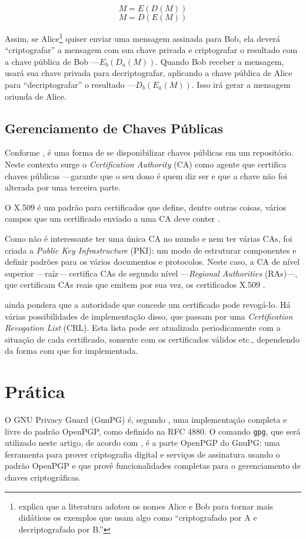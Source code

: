 \documentclass[12px,a4paper,twoside]{article}
\begin{document}
\begin{equation}
M = E(D(M))
\end{equation}
\begin{equation}
M = D(E(M))
\end{equation}

Assim, se Alice\footnote{\cite{oliveira:2} explica que a literatura adotou os
nomes Alice e Bob para tornar mais didáticos os exemplos que usam algo como
``criptografado por A e decriptografado por B.''} quiser enviar uma mensagem
assinada para Bob, ela deverá ``criptografar'' a mensagem com sua chave privada
e criptografar o resultado com a chave pública de Bob ---$E_b(D_a(M))$.  Quando
Bob receber a mensagem, usará sua chave privada para decriptografar, aplicando
a chave pública de Alice para ``decriptografar'' o resultado ---$D_b(E_a(M))$.
Isso irá gerar a mensagem oriunda de Alice.

\subsection{Gerenciamento de Chaves Públicas}
\label{sec:teoria:pki}
Conforme \cite{tanenbaum}, é uma forma de se disponibilizar chaves públicas em
um repositório.  Neste contexto surge o \textit{Certification Authority} (CA)
como agente que certifica chaves públicas ---garante que o seu dono é quem diz
ser e que a chave não foi alterada por uma terceira parte.

O X.509 é um padrão para certificados que define, dentre outras coisas, vários
campos que um certificado enviado a uma CA deve conter \cite{tanenbaum}.

Como não é interessante ter uma única CA no mundo e nem ter várias CAs, foi
criada a \textit{Public Key Infrastructure} (PKI): um modo de estruturar
componentes e definir padrões para os vários documentos e protocolos.  Neste
caso, a CA de nível superior ---raíz--- certifica CAs de segundo nível
---\textit{Regional Authorities} (RAs)---, que certificam CAs reais que emitem
por sua vez, os certificados X.509 \cite{tanenbaum}.

\cite{tanenbaum} ainda pondera que a autoridade que concede um certificado pode
revogá-lo.  Há várias possibilidades de implementação disso, que passam por uma
\textit{Certification Revogation List} (CRL).  Esta lista pode ser atualizada
periodicamente com a situação de cada certificado, somente com os certificados
válidos etc., dependendo da forma com que for implementada.


\section{Prática}
\label{sec:pratica}
O GNU Privacy Guard (GnuPG) é, segundo \cite{gnupg:hp}, uma implementação
completa e livre do padrão OpenPGP, como definido na RFC 4880.  O comando
\texttt{gpg}, que será utilizado neste artigo, de acordo com \cite{gnupg:man},
é a parte OpenPGP do GnuPG: uma ferramenta para prover criptografia digital e
serviços de assinatura usando o padrão OpenPGP e que provê funcionalidades
completas para o gerenciamento de chaves criptográficas.
\end{document}
